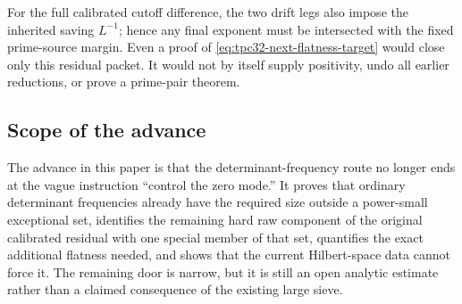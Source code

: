 For the full calibrated cutoff difference, the two drift legs also impose
the inherited saving $L^{-1}$; hence any final exponent must be intersected
with the fixed prime-source margin.  Even a proof of
\eqref{eq:tpc32-next-flatness-target} would close only this residual packet.
It would not by itself supply positivity, undo all earlier reductions, or
prove a prime-pair theorem.

\subsection{Scope of the advance}

The advance in this paper is that the determinant-frequency route no longer
ends at the vague instruction ``control the zero mode.''  It proves that
ordinary determinant frequencies already have the required size outside a
power-small exceptional set, identifies the remaining hard raw component of
the original calibrated residual with one special member of that set,
quantifies the exact additional flatness needed, and
shows that the current Hilbert-space data cannot force it.  The remaining
door is narrow, but it is still an open analytic estimate rather than a
claimed consequence of the existing large sieve.
